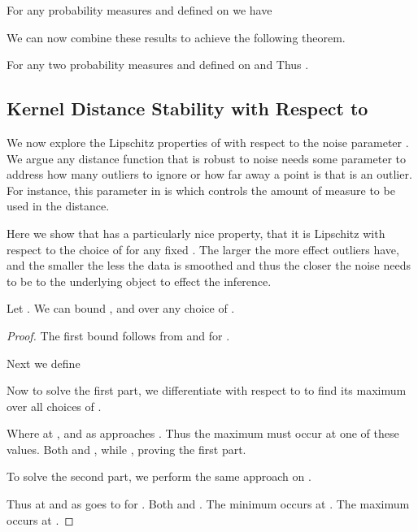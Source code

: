 \documentclass[11pt]{myclass}
\begin{document}
\begin{lemma} 
For any probability measures  and  defined on  we have

\label{lem:EMD}
\end{lemma}


We can now combine these results to achieve the following theorem.  

\begin{theorem}
\label{thm:DK-W2}
For any two probability measures  and  defined on  
  and   Thus
.  
\end{theorem}







\subsection{Kernel Distance Stability with Respect to }
\label{subsection:sigma}
We now explore the Lipschitz properties of  with respect to the noise parameter .  
We argue any distance function that is robust to noise needs some parameter to address how many outliers to ignore or how far away a point is that is an  outlier.  For instance, this parameter in  is  which controls the amount of measure  to be used in the distance.  

Here we show that  has a particularly nice property, that it is Lipschitz with respect to the choice of  for any fixed .  The larger  the more effect outliers have, and the smaller  the less the data is smoothed and thus the closer the noise needs to be to the underlying object to effect the inference.  

\begin{lemma}
Let .  We can bound
, 
 and 
 over any choice of .  
\label{lem:h-max}
\end{lemma}
\begin{proof}
The first bound follows from  and  for . 

Next we define


Now to solve the first part, we differentiate  with respect to  to find its maximum over all choices of .  

Where  at ,  and as  approaches .  Thus the maximum must occur at one of these values.  Both  and , while , proving the first part.  

To solve the second part, we perform the same approach on .  

Thus  at  and as  goes to  for .  Both  and .  The minimum occurs at .  
The maximum occurs at .  
\end{proof}
\end{document}
